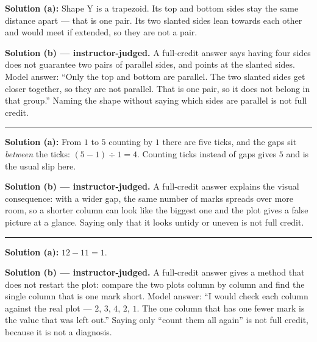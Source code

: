 \documentclass[12pt]{article}
\begin{document}
\textbf{Solution (a):} Shape Y is a trapezoid. Its top and bottom sides stay the same distance apart
--- that is one pair. Its two slanted sides lean towards each other and would meet if extended, so
they are not a pair. 

\textbf{Solution (b) --- instructor-judged.} A full-credit answer says having four sides does not
guarantee two pairs of parallel sides, and points at the slanted sides. Model answer: ``Only the top
and bottom are parallel. The two slanted sides get closer together, so they are not parallel. That is
one pair, so it does not belong in that group.'' Naming the shape without saying which sides are
parallel is not full credit.

\vspace{0.15cm}\noindent\rule{\linewidth}{0.2pt}


\textbf{Solution (a):} From $1$ to $5$ counting by $1$ there are five ticks, and the gaps sit
\emph{between} the ticks: $(5 - 1) \div 1 = 4$. Counting ticks instead of gaps gives $5$ and is the
usual slip here. 

\textbf{Solution (b) --- instructor-judged.} A full-credit answer explains the visual consequence: with
a wider gap, the same number of marks spreads over more room, so a shorter column can look like the
biggest one and the plot gives a false picture at a glance. Saying only that it looks untidy or
uneven is not full credit.

\vspace{0.15cm}\noindent\rule{\linewidth}{0.2pt}


\textbf{Solution (a):} $12 - 11 = 1$. 

\textbf{Solution (b) --- instructor-judged.} A full-credit answer gives a method that does not restart
the plot: compare the two plots column by column and find the single column that is one mark short.
Model answer: ``I would check each column against the real plot --- $2$, $3$, $4$, $2$, $1$. The one
column that has one fewer mark is the value that was left out.'' Saying only ``count them all again''
is not full credit, because it is not a diagnosis.
\end{document}
